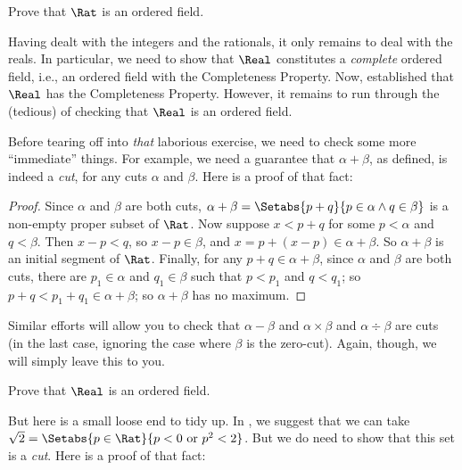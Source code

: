 \documentclass[../../../include/open-logic-section]{subfiles}
\begin{document}
\begin{prob}
Prove that $\Rat$ is an ordered field.
\end{prob}

Having dealt with the integers and the rationals, it only remains to
deal with the reals. In particular, we need to show that $\Real$
constitutes a \emph{complete} ordered field, i.e., an ordered field
with the Completeness Property. Now, 
established that $\Real$ has the Completeness Property. However, it
remains to run through the (tedious) of checking that $\Real$ is an
ordered field. 

Before tearing off into \emph{that} laborious exercise, we need to
check some more ``immediate'' things. For example, we need a guarantee
that $\alpha + \beta$, as defined, is indeed a \emph{cut}, for any
cuts $\alpha$ and $\beta$. Here is a proof of that fact:

\begin{proof}	
Since $\alpha$ and $\beta$ are both cuts, $\alpha + \beta = \Setabs{p
+ q}{p \in \alpha \land q \in \beta}$ is a non-empty proper subset of
$\Rat$. Now suppose $x < p + q$ for some $p < \alpha$ and $q < \beta$.
Then $x - p < q$, so $x - p \in \beta$, and $x = p + (x - p) \in
\alpha + \beta$. So $\alpha + \beta$ is an initial segment of $\Rat$.
Finally, for any $p + q \in \alpha + \beta$, since $\alpha$ and
$\beta$ are both cuts, there are $p_1 \in \alpha$ and $q_1 \in \beta$
such that $p < p_1$ and $q < q_1$; so $p + q < p_1 + q_1 \in \alpha +
\beta$; so $\alpha + \beta$ has no maximum. 
\end{proof}

Similar efforts will allow you to check that $\alpha - \beta$ and
$\alpha \times \beta$ and $\alpha \div \beta$ are cuts (in the last
case, ignoring the case where $\beta$ is the zero-cut). Again, though,
we will simply leave this to you. 

\begin{prob}
Prove that $\Real$ is an ordered field.
\end{prob}

But here is a small loose end to tidy up. In
, we suggest that we can take $\sqrt{2} =
\Setabs{p \in \Rat}{p < 0 \text{ or }p^2 < 2}$. But we do need to show
that this set is a \emph{cut}. Here is a proof of that fact:
\end{document}
